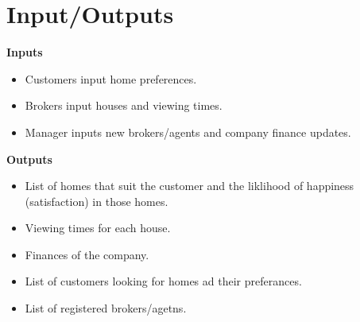 \documentclass[12pt]{article}
\begin{document}
	\section{Input/Outputs}
		\begin{flushleft}
			\textbf{Inputs}
			\begin{itemize}
				\item Customers input home preferences.
				\item Brokers input houses and viewing times.
				\item Manager inputs new brokers/agents and company finance updates.
			\end{itemize}
			
			\textbf{Outputs}
			\begin{itemize}
				\item List of homes that suit the customer and the liklihood of happiness (satisfaction) in those homes.
				\item Viewing times for each house.
				\item Finances of the company.
				\item List of customers looking for homes ad their preferances.
				\item List of registered brokers/agetns.
			\end{itemize}
			
		\end{flushleft}
	
\end{document}
